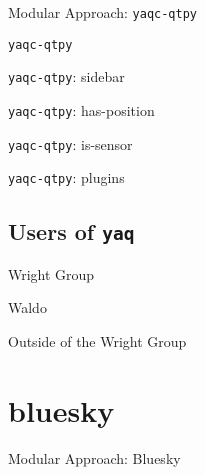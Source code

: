 \documentclass{presentation}
\begin{document}
\begin{frame}{Modular Approach: \texttt{yaqc-qtpy}}
\end{frame}

\begin{frame}{\texttt{yaqc-qtpy}}
\end{frame}
\begin{frame}{\texttt{yaqc-qtpy}: sidebar}
\end{frame}
\begin{frame}{\texttt{yaqc-qtpy}: has-position}
\end{frame}
\begin{frame}{\texttt{yaqc-qtpy}: is-sensor}
\end{frame}
\begin{frame}{\texttt{yaqc-qtpy}: plugins}
\end{frame}

\subsection{Users of \texttt{yaq}}

\begin{frame}{Wright Group}
\end{frame}

\begin{frame}{Waldo}
\end{frame}

\begin{frame}{Outside of the Wright Group}
\end{frame}

\section{bluesky}

\begin{frame}{Modular Approach: Bluesky}
\end{frame}
\end{document}
